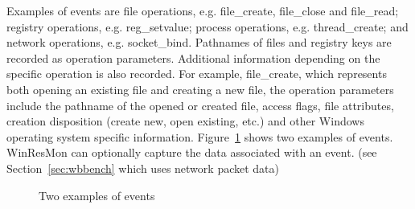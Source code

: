Examples of events are file operations,
e.g.  file\_create, file\_close and file\_read;
registry operations, e.g. reg\_setvalue;
process operations, e.g.  thread\_create;
and network operations, e.g. socket\_bind.
Pathnames of files and registry keys are recorded as operation parameters.
Additional information depending on the specific operation is also recorded.
For example, file\_create, which represents both opening an existing file
and creating a new file, the operation parameters include the pathname of
the opened or created file, access flags, file attributes, creation disposition
(create new, open existing,
etc.) and other Windows operating system specific information.
Figure~\ref{fig:logex} shows two examples of events.
WinResMon can optionally capture the data associated with an
event. (see Section~\ref{sec:wbbench} which uses network packet data)

\begin{figure}
\caption{Two examples of events}
\label{fig:logex}
\end{figure}


